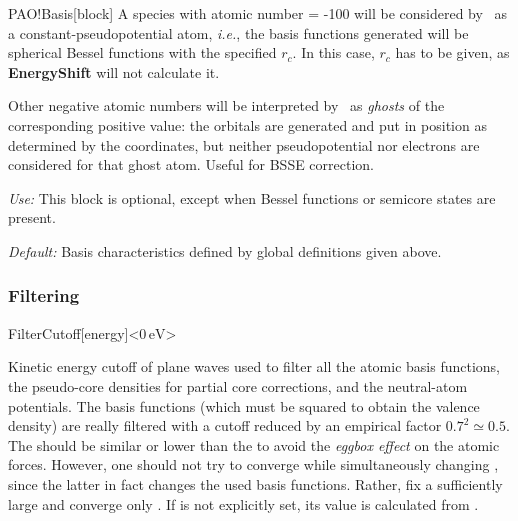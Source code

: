 \begin{fdfentry}{PAO!Basis}[block]
A species with atomic number = -100 will be considered by \siesta\ as
a constant-pseudopotential atom, \textit{i.e.}, the basis functions
generated will be spherical Bessel functions
with the specified $r_c$. In this case, $r_c$ has to be given, as
\textbf{EnergyShift} will not calculate it.

Other negative atomic numbers will be interpreted by \siesta\ as
\textit{ghosts}
of the corresponding positive value: the orbitals
are generated and put in position as determined by the coordinates,
but neither pseudopotential nor electrons are considered for that
ghost atom. Useful for BSSE correction.

\textit{Use:} This block is optional, except when Bessel functions or
semicore states are present.

\textit{Default:} Basis characteristics defined by global definitions given
above.

\end{fdfentry}

\subsubsection{Filtering}
\label{sec:filtering}

\begin{fdfentry}{FilterCutoff}[energy]<$0\,\mathrm{eV}$>

  Kinetic energy cutoff of plane waves used to filter all the atomic
  basis functions, the pseudo-core densities for partial core
  corrections, and the neutral-atom potentials.  The basis functions
  (which must be squared to obtain the valence density) are really
  filtered with a cutoff reduced by an empirical factor
  $0.7^2 \simeq 0.5$. The  should be similar or
  lower than the  to avoid the \emph{eggbox
      effect} on the atomic forces.  However, one should not try to
  converge  while simultaneously changing
  , since the latter in fact changes the used
  basis functions. Rather, fix a sufficiently large
   and converge only .  If
   is not explicitly set, its value is calculated
  from .

\end{fdfentry}

